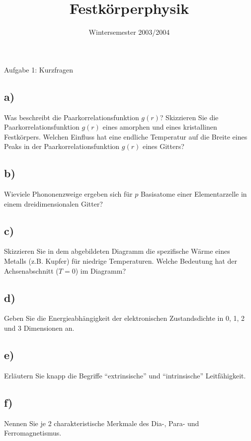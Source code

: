 

\subject{FKP}
\title{Festkörperphysik}
\date{
    Wintersemester 2003/2004
}



\maketitle
\thispagestyle{empty}
\newpage


\begin{aufgabe}{Aufgabe 1: Kurzfragen}
    \subsection{a)}
    Was beschreibt die Paarkorrelationsfunktion $g(r)$?
    Skizzieren Sie die Paarkorrelationsfunktion $g(r)$ eines amorphen und eines kristallinen Festkörpers.
    Welchen Einfluss hat eine endliche Temperatur auf die Breite eines Peaks in der Paarkorrelationsfunktion $g(r)$ eines Gitters?

    \subsection{b)}
    Wieviele Phononenzweige ergeben sich für $p$ Basisatome einer Elementarzelle in einem dreidimensionalen Gitter?

    \subsection{c)}
    Skizzieren Sie in dem abgebildeten Diagramm die spezifische Wärme eines Metalls (z.B. Kupfer) für niedrige Temperaturen.
    Welche Bedeutung hat der Achsenabschnitt ($T = 0$) im Diagramm?

    \subsection{d)}
    Geben Sie die Energieabhängigkeit der elektronischen Zustandsdichte in 0, 1, 2 und 3 Dimensionen an.

    \subsection{e)}
    Erläutern Sie knapp die Begriffe \enquote{extrinsische} und \enquote{intrinsische} Leitfähigkeit.

    \subsection{f)}
    Nennen Sie je 2 charakteristische Merkmale des Dia-, Para- und Ferromagnetismus.
\end{aufgabe}

